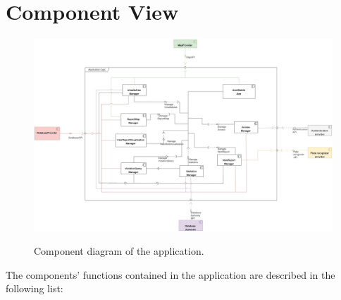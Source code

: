 \documentclass[../RASD.tex]{subfiles}
\begin{document}
    \section{Component View}\label{sec:component-view}
    \begin{figure}[H]
        \centering
        \includegraphics[scale = 0.24]{assets/component.png}\\[1.6 cm]
        \caption[\textit{Component} Diagram]{Component diagram of the application.}
    \end{figure}
    The components’ functions contained in the application are described in the following list:
\end{document}

